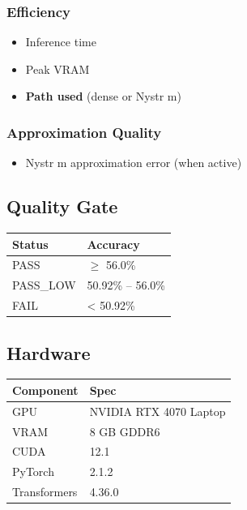 \subsubsection{Efficiency}
\begin{itemize}
\item Inference time
\item Peak VRAM
\item \textbf{Path used} (dense or Nystr m)

\end{itemize}
\subsubsection{Approximation Quality}
\begin{itemize}
\item Nystr m approximation error (when active)

\end{itemize}
\subsection{Quality Gate}

\begin{table}[H]
\centering
\small
\begin{tabular}{ll}
\toprule
\textbf{Status} & \textbf{Accuracy} \\
\midrule
PASS & $\ge$ 56.0\% \\
PASS\_LOW & 50.92\% -- 56.0\% \\
FAIL & < 50.92\% \\
\bottomrule
\end{tabular}
\end{table}

\subsection{Hardware}

\begin{table}[H]
\centering
\small
\begin{tabular}{ll}
\toprule
\textbf{Component} & \textbf{Spec} \\
\midrule
GPU & NVIDIA RTX 4070 Laptop \\
VRAM & 8 GB GDDR6 \\
CUDA & 12.1 \\
PyTorch & 2.1.2 \\
Transformers & 4.36.0 \\
\bottomrule
\end{tabular}
\end{table}

